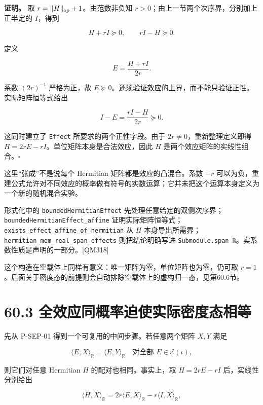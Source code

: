 \documentclass[
  11pt,
  oneside]{book}
\begin{document}
\textbf{证明。} 取 \(r=\|H\|_{\rm op}+1\)。由范数非负知
\(r>0\)；由上一节两个次序界，分别加上正半定的 \(I\)，得到

\[
H+rI\succeq0,\qquad rI-H\succeq0.
\]

定义

\[
E=\frac{H+rI}{2r}.
\]

系数 \((2r)^{-1}\) 严格为正，故
\(E\succeq0\)。还须验证效应的上界，而不能只验证正性。实际矩阵恒等式给出

\[
I-E=\frac{rI-H}{2r}\succeq0.
\]

这同时建立了 \texttt{Effect} 所要求的两个正性字段。由于
\(2r\ne0\)，重新整理定义即得 \(H=2rE-rI\)。单位矩阵本身是合法效应，因此
\(H\) 是两个效应矩阵的实线性组合。\(\square\)

这里``张成''不是说每个 Hermitian 矩阵都是效应的凸混合。系数 \(-r\)
可以为负，重建公式允许对不同效应的概率做有符号的实数运算；它并未把这个运算本身定义为一个新的随机混合实验。

形式化中的 \texttt{boundedHermitianEffect}
先处理任意给定的双侧次序界；\texttt{boundedHermitianEffect\_\allowbreak affine}
证明实际矩阵恒等式；\texttt{exists\_\allowbreak effect\_\allowbreak affine\_\allowbreak of\_\allowbreak hermitian} 从
\(H\) 本身导出所需界；\texttt{hermitian\_\allowbreak mem\_\allowbreak real\_\allowbreak span\_\allowbreak effects}
则把结论明确写进
\texttt{Submodule.span\ ℝ}。实系数性质是声明的一部分。{[}QM318{]}

这个构造在空载体上同样有意义：唯一矩阵为零，单位矩阵也为零，仍可取
\(r=1\)。后面关于密度态的前提则会自动排除空载体上的虚构归一态，见第60.6节。

\hypertarget{ux5168ux6548ux5e94ux540cux6982ux7387ux8febux4f7fux5b9eux9645ux5bc6ux5ea6ux6001ux76f8ux7b49}{%
\section{60.3
全效应同概率迫使实际密度态相等}\label{ux5168ux6548ux5e94ux540cux6982ux7387ux8febux4f7fux5b9eux9645ux5bc6ux5ea6ux6001ux76f8ux7b49}}

先从 P-SEP-01 得到一个可复用的中间步骤。若任意两个矩阵 \(X,Y\) 满足

\[
\langle E,X\rangle_{\mathbb R}
=\langle E,Y\rangle_{\mathbb R}
\quad\text{对全部 }E\in\mathcal E(\iota),
\]

则它们对任意 Hermitian \(H\) 的配对也相同。事实上，取 \(H=2rE-rI\)
后，实线性分别给出

\[
\langle H,X\rangle_{\mathbb R}
=2r\langle E,X\rangle_{\mathbb R}
-r\langle I,X\rangle_{\mathbb R},
\]
\end{document}
